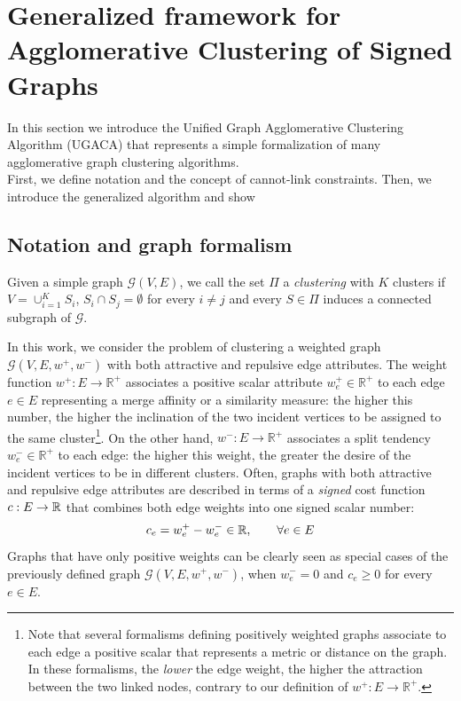 \section{Generalized framework for Agglomerative Clustering of Signed Graphs}
In this section we introduce the Unified Graph Agglomerative Clustering Algorithm (UGACA) that represents a simple  formalization of many agglomerative graph clustering algorithms. \\
First, we define notation and the concept of cannot-link constraints. Then, we introduce the generalized algorithm and show 

\subsection{Notation and graph formalism} \label{sec:notation}

Given a simple graph $\mathcal{G}(V,E)$, we call the set $\Pi$ a \emph{clustering} with $K$ clusters if $V = \cup_{i=1}^K S_i $, $S_i \cap S_j = \emptyset$ for every $i\neq j$ and every $S \in \Pi$ induces a connected subgraph of $\mathcal{G}$.

In this work, we consider the problem of clustering a weighted graph $\mathcal{G}(V,E,w^+, w^-)$ with both attractive and repulsive edge attributes. The weight function $w^+: E \rightarrow \mathbb{R}^+$ associates a positive scalar attribute $w_e^+\in \mathbb{R}^+$ to each edge $e \in E$ representing a merge affinity or a similarity measure: the higher this number, the higher the inclination of the two incident vertices to be assigned to the same cluster\footnote{Note that several formalisms defining positively weighted graphs associate to each edge a positive scalar that represents a metric or distance on the graph. In these formalisms, the \emph{lower} the edge weight, the higher the attraction between the two linked nodes, contrary to our definition of $w^+: E \rightarrow \mathbb{R}^+$.}. On the other hand, $w^-: E \rightarrow \mathbb{R}^+$ associates a split tendency $w_e^- \in \mathbb{R}^+$ to each edge: the higher this weight, the greater the desire of the incident vertices to be in different clusters. 
Often, graphs with both attractive and repulsive edge attributes are described in terms of a \emph{signed} cost function $c: E \rightarrow \mathbb{R}$ that combines both edge weights into one signed scalar number: 
\begin{equation}
c_e = w_e^+ - w_e^- \in \mathbb{R}, \quad \quad \forall e \in E
\end{equation}
Graphs that have only positive weights can be clearly seen as special cases of the previously defined graph $\mathcal{G}(V,E,w^+,w^-)$, when $w^-_e=0$ and $c_e \geq 0$ for every $e \in E$.

